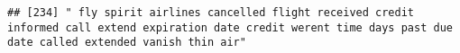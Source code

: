 \documentclass[
]{article}
\begin{document}
\begin{verbatim}
## [234] " fly spirit airlines cancelled flight received credit informed call extend expiration date credit werent time days past due date called extended vanish thin air"                                                                                                                                                                                                                                                                                                                                                                                                                                                                                                                                                                                                                                                                                                                                                                                                                                                                                                                                                                                                                                                                                                                                                                                                                                                                                                                                                                                                                                                                                                                                                                                                                              

\end{verbatim}
\end{document}
